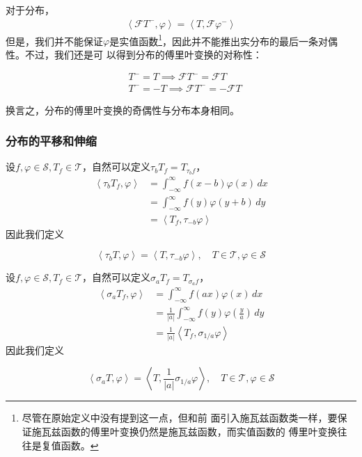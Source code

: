 对于分布，
\begin{align*}
    \left\langle\mathcal{F}T^-,\varphi\right\rangle =\left\langle T,\mathcal{F}\varphi^-\right\rangle
\end{align*}
但是，我们并不能保证$\varphi$是实值函数\footnote{尽管在原始定义中没有提到这一点，但和前
    面引入施瓦兹函数类一样，要保证施瓦兹函数的傅里叶变换仍然是施瓦兹函数，而实值函数的
    傅里叶变换往往是复值函数。}，因此并不能推出实分布的最后一条对偶性。不过，我们还是可
以得到分布的傅里叶变换的对称性：
\begin{theorem}[分布的傅里叶变换的对称性]
    \begin{align*}
    &T^-=T\implies\mathcal{F} T^-=\mathcal{F} T \\
    &T^-=-T\implies\mathcal{F} T^-=-\mathcal{F} T
\end{align*}
\end{theorem}
换言之，分布的傅里叶变换的奇偶性与分布本身相同。

\subsubsection{分布的平移和伸缩}

设$f,\varphi\in\mathcal{S} ,T_f\in\mathcal{T} $，自然可以定义$\tau_b T_f=T_{\tau_b f}$，
\begin{align*}
    \left\langle \tau_b T_f,\varphi\right\rangle & =\int_{-\infty}^{\infty}f(x-b)\varphi(x)\,dx \\
                                      & =\int_{-\infty}^{\infty}f(y)\varphi(y+b)\,dy \\
                                      & =\left\langle T_f,\tau_{-b}\varphi\right\rangle
\end{align*}
因此我们定义\begin{definition}[分布的平移]\label{def:distribution_delay}
    \begin{equation*}
    \left\langle \tau_b T,\varphi\right\rangle=\left\langle T,\tau_{-b}\varphi\right\rangle,\quad T\in\mathcal{T} ,\varphi\in\mathcal{S}
\end{equation*}
\end{definition}

设$f,\varphi\in\mathcal{S} ,T_f\in\mathcal{T} $，自然可以定义$\sigma_a T_f=T_{\sigma_a f}$，
\begin{align*}
    \left\langle \sigma_a T_f,\varphi\right\rangle & =\int_{-\infty}^{\infty}f(ax)\varphi(x)\,dx                                  \\
                                        & =\frac{1}{|a|}\int_{-\infty}^{\infty}f(y)\varphi\left(\frac{y}{a}\right)\,dy \\
                                        & =\frac{1}{|a|}\left\langle T_f,\sigma_{1/a}\varphi\right\rangle
\end{align*}
因此我们定义\begin{definition}[分布的伸缩]
    \begin{equation*}
    \left\langle\sigma_a T,\varphi\right\rangle=\left\langle T,\frac{1}{|a|}\sigma_{1/a}\varphi\right\rangle,\quad T\in\mathcal{T} ,\varphi\in\mathcal{S}
\end{equation*}
\end{definition}


